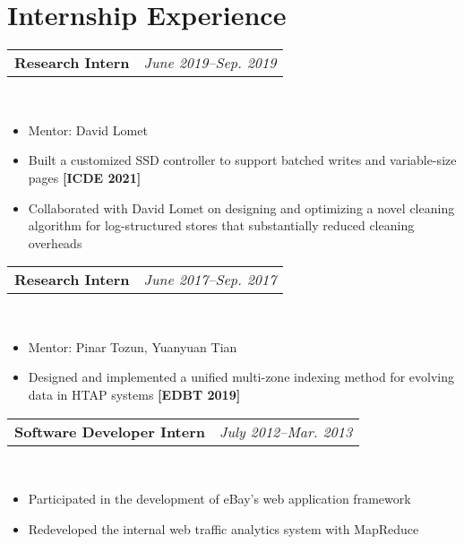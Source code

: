 \documentclass[11pt,a4paper,roman]{moderncv}        %
\makeatletter
\newcommand{\reduce}{\vspace{-0.115in}}
\newcommand{\cvexpr}[5][1em]{
  \begin{tabular*}{\maincolumnwidth}{l@{\extracolsep{\fill}}r}%
    {\textbf{#3}\ifthenelse{\equal{#3}{}}{\textbf{#4}}{, #4}} & {\itshape#2}%
  \end{tabular*}%
  \\
  \begin{minipage}{\maincolumnwidth}%
        #5%
  \end{minipage}%
  \par\addvspace{#1}
}
\makeatother
\begin{document}
\reduce
\reduce

\section{Internship Experience}
\vspace{-0.05in}
\cvexpr{June 2019--Sep. 2019}{Research Intern}{Microsoft Research, Redmond}{
	\begin{itemize}
		\item Mentor: {David Lomet}
		\item Built a customized SSD controller to support batched writes and variable-size pages \textbf{[ICDE 2021]}
		\item Collaborated with David Lomet on designing and optimizing a novel cleaning algorithm for log-structured stores that substantially
		reduced cleaning overheads
	\end{itemize}
}
\reduce
\cvexpr{June 2017--Sep. 2017}{Research Intern}{IBM Almaden Research Center}{
	\begin{itemize}
		\item Mentor: {Pinar Tozun}, {Yuanyuan Tian}
		\item Designed and implemented a unified multi-zone indexing method for evolving data in HTAP systems \textbf{[EDBT 2019]}
	\end{itemize}
}
\reduce
\cvexpr{July 2012--Mar. 2013}{Software Developer Intern}{eBay China Development Center}{
\begin{itemize}
	\item Participated in the development of eBay's web application framework
	\item Redeveloped the internal web traffic analytics system with MapReduce
\end{itemize}
}
\reduce
\reduce
\end{document}
